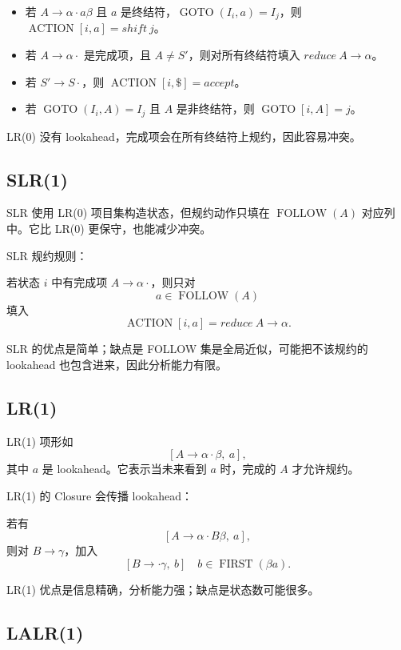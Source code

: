 \documentclass[UTF8,fontset=none,11pt]{ctexart}
\newenvironment{defbox}[1][]{%
  \par\medskip\noindent{\color{defrule}\rule{\linewidth}{1.1pt}}\par\nopagebreak
  \noindent{\bfseries\color{defrule}#1}\par\nopagebreak\smallskip}%
  {\par\nopagebreak\smallskip\noindent{\color{defrule}\rule{\linewidth}{0.4pt}}\par\medskip}
\newcommand{\FIRST}{\operatorname{FIRST}}
\newcommand{\FOLLOW}{\operatorname{FOLLOW}}
\newcommand{\GOTO}{\operatorname{GOTO}}
\newcommand{\ACTION}{\operatorname{ACTION}}
\begin{document}
\begin{itemize}
  \item 若 \(A\to\alpha\cdot a\beta\) 且 \(a\) 是终结符，\(\GOTO(I_i,a)=I_j\)，则 \(\ACTION[i,a]=shift\ j\)。
  \item 若 \(A\to\alpha\cdot\) 是完成项，且 \(A\ne S'\)，则对所有终结符填入 \(reduce\ A\to\alpha\)。
  \item 若 \(S'\to S\cdot\)，则 \(\ACTION[i,\$]=accept\)。
  \item 若 \(\GOTO(I_i,A)=I_j\) 且 \(A\) 是非终结符，则 \(\GOTO[i,A]=j\)。
\end{itemize}

LR(0) 没有 lookahead，完成项会在所有终结符上规约，因此容易冲突。

\subsection{SLR(1)}

\begin{defbox}[SLR(1)]
SLR 使用 LR(0) 项目集构造状态，但规约动作只填在 \(\FOLLOW(A)\) 对应列中。它比 LR(0) 更保守，也能减少冲突。
\end{defbox}

SLR 规约规则：

若状态 \(i\) 中有完成项 \(A\to\alpha\cdot\)，则只对
\[
a\in\FOLLOW(A)
\]
填入
\[
\ACTION[i,a]=reduce\ A\to\alpha.
\]

SLR 的优点是简单；缺点是 FOLLOW 集是全局近似，可能把不该规约的 lookahead 也包含进来，因此分析能力有限。

\subsection{LR(1)}

\begin{defbox}[LR(1) item]
LR(1) 项形如
\[
[A\to\alpha\cdot\beta,\ a],
\]
其中 \(a\) 是 lookahead。它表示当未来看到 \(a\) 时，完成的 \(A\) 才允许规约。
\end{defbox}

LR(1) 的 Closure 会传播 lookahead：

若有
\[
[A\to\alpha\cdot B\beta,\ a],
\]
则对 \(B\to\gamma\)，加入
\[
[B\to\cdot\gamma,\ b]\quad b\in\FIRST(\beta a).
\]

LR(1) 优点是信息精确，分析能力强；缺点是状态数可能很多。

\subsection{LALR(1)}
\end{document}
